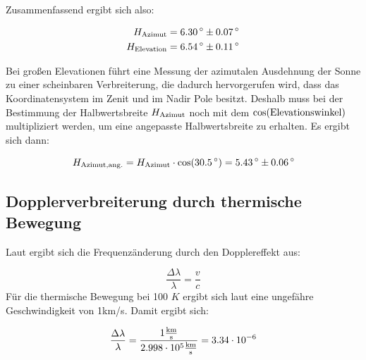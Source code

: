 Zusammenfassend ergibt sich also:

\begin{align}
H_{\mathrm{Azimut}} = 6.30\,^\circ \pm 0.07\,^\circ \\
H_{\mathrm{Elevation}} = 6.54\,^\circ \pm 0.11\,^\circ
\end{align}

Bei großen Elevationen führt eine Messung der azimutalen Ausdehnung der Sonne zu einer scheinbaren Verbreiterung, die dadurch hervorgerufen wird, dass das Koordinatensystem im Zenit und im Nadir Pole besitzt. Deshalb muss bei der Bestimmung der Halbwertsbreite $H_{\mathrm{Azimut}}$ noch mit dem $ \cos (\mathrm{Elevationswinkel}) $ multipliziert werden, um eine angepasste Halbwertsbreite zu erhalten. Es ergibt sich dann:

\begin{equation}
H_{\mathrm{Azimut,ang.}} = H_{\mathrm{Azimut}} \cdot \cos (30.5\,^\circ) = 5.43\,^\circ \pm 0.06\,^\circ \\
\end{equation}

\subsection{Dopplerverbreiterung durch thermische Bewegung}
Laut \cite{ronomischesPraktikum} ergibt sich die Frequenzänderung durch den Dopplereffekt aus:

\begin{equation}
\frac{\Delta \lambda}{\lambda} = \frac{v}{c}
\end{equation}
Für die thermische Bewegung bei 100 $K$ ergibt sich laut \cite{ronomischesPraktikum} eine ungefähre Geschwindigkeit von 1km/s. Damit ergibt sich:

\begin{equation}
\frac{\Delta \lambda}{\lambda} = \frac{1 \frac{\mathrm{km}}{\mathrm{s}}}{2.998 \cdot 10^5 \frac{\mathrm{km}}{\mathrm{s}}} = 3.34 \cdot 10^{-6}
\end{equation}

